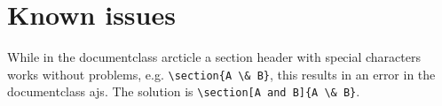 \documentclass[article]{ajs}
\begin{document}
\section{Known issues}

While in the documentclass arcticle a section header with special characters works without problems, e.g. \verb|\section{A \& B}|, this results in an error in the documentclass ajs. The solution is \verb|\section[A and B]{A \& B}|.


%

\end{document}
